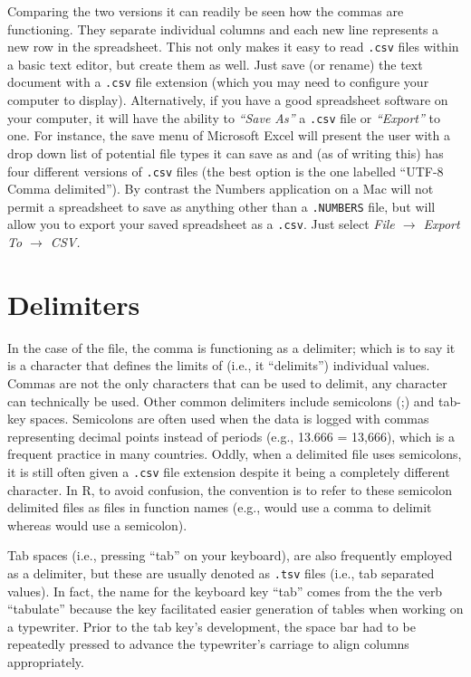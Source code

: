 Comparing the two versions it can readily be seen how the commas are functioning. They separate individual columns and each new line represents a new row in the spreadsheet. This not only makes it easy to read \texttt{.csv} files within a basic text editor, but create them as well. Just save (or rename) the text document with a \texttt{.csv} file extension (which you may need to configure your computer to display). Alternatively, if you have a good spreadsheet software on your computer, it will have the ability to \textit{``Save As''} a \texttt{.csv} file or \textit{``Export''} to one. For instance, the save menu of Microsoft Excel will present the user with a drop down list of potential file types it can save as and (as of writing this) has four different versions of \texttt{.csv} files (the best option is the one labelled ``UTF-8 Comma delimited''). By contrast the Numbers application on a Mac will not permit a spreadsheet to save as anything other than a \texttt{.NUMBERS} file, but will allow you to export your saved spreadsheet as a \texttt{.csv}. Just select \textit{File $\rightarrow$ Export To $\rightarrow$ CSV.}

\clearpage

\section{Delimiters}

In the case of the  file, the comma is functioning as a \gls{delimiter}; which is to say it is a character that defines the limits of (i.e., it ``delimits'') individual values. Commas are not the only characters that can be used to delimit, any character can technically be used. Other common delimiters include semicolons (;) and tab-key spaces. Semicolons are often used when the data is logged with commas representing decimal points instead of periods (e.g., 13.666 = 13,666), which is a frequent practice in many countries. Oddly, when a delimited file uses semicolons, it is still often given a \texttt{.csv} file extension despite it being a completely different character.  In R, to avoid confusion, the convention is to refer to these semicolon delimited files as  files in function names (e.g.,  would use a comma to delimit whereas  would use a semicolon).

Tab spaces (i.e., pressing ``tab'' on your keyboard), are also frequently employed as a delimiter, but these are usually denoted as \texttt{.tsv} files (i.e., tab separated values). In fact, the name for the keyboard key ``tab'' comes from the the verb ``tabulate'' because the key facilitated easier generation of tables when working on a typewriter. Prior to the tab key's development, the space bar had to be repeatedly pressed to advance the typewriter's carriage to align columns appropriately. 

